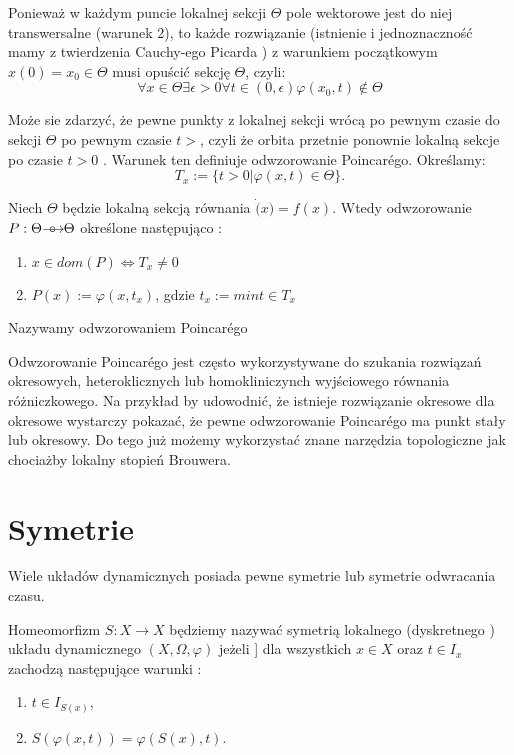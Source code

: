   Ponieważ w każdym puncie lokalnej sekcji $ \Theta $ pole wektorowe jest do niej transwersalne (warunek 2), to każde 
  rozwiązanie (istnienie i jednoznaczność mamy z twierdzenia Cauchy-ego Picarda ) z warunkiem początkowym 
  $ x(0) = x_0 \in \Theta $ musi opuścić sekcję $ \Theta $, czyli:
      $$
       \forall x \in \Theta \exists{\epsilon > 0} \forall t \in (0,\epsilon) \varphi(x_0,t) \notin \Theta 
      $$
 
  Może sie zdarzyć, że pewne punkty z lokalnej sekcji wrócą po pewnym czasie do sekcji $ \Theta $ po pewnym
  czasie $ t > $, czyli że orbita przetnie ponownie lokalną sekcje po czasie $ t > 0 $ . 
  Warunek ten definiuje odwzorowanie Poincar\'ego. Określamy:
  $$
    T_x := \{ t > 0 | \varphi(x,t) \in \Theta \}.
  $$

  \begin{definition} Niech $ \Theta $ będzie lokalną sekcją równania $ \dot(x) = f(x)$. Wtedy odwzorowanie 
    $ P: \Theta {\mathrel{\longrightarrow\mkern-25mu\circ}\;\;} \Theta $ określone następująco :
    \begin{enumerate}
     \item $ x \in dom(P) \Leftrightarrow T_x \neq 0 $
     \item $ P(x) := \varphi(x,t_x)$, gdzie $t_x := min{t \in T_x} $
    \end{enumerate}
    Nazywamy odwzorowaniem Poincar\'ego

  \end{definition}
  
Odwzorowanie Poincar\'ego jest często wykorzystywane do szukania rozwiązań okresowych, heteroklicznych lub homokliniczynch wyjściowego
równania różniczkowego. Na przykład by udowodnić, że istnieje rozwiązanie okresowe dla okresowe wystarczy pokazać, że pewne odwzorowanie 
Poincar\'ego ma punkt stały lub okresowy. Do tego już możemy wykorzystać znane narzędzia topologiczne jak chociażby lokalny stopień Brouwera.


\section{Symetrie}

Wiele układów dynamicznych posiada pewne symetrie lub symetrie odwracania czasu.
\begin{definition}
  Homeomorfizm $ S : X \to X $ będziemy nazywać symetrią lokalnego (dyskretnego ) układu dynamicznego $(X,\Omega,\varphi) $ jeżeli ]
  dla wszystkich $ x \in X $ oraz $ t \in I_x $ zachodzą następujące warunki :
  \begin{enumerate}
   \item $ t \in I_{S(x)}$,
   \item $ S(\varphi(x,t)) = \varphi(S(x),t) $.
  \end{enumerate}

\end{definition}



